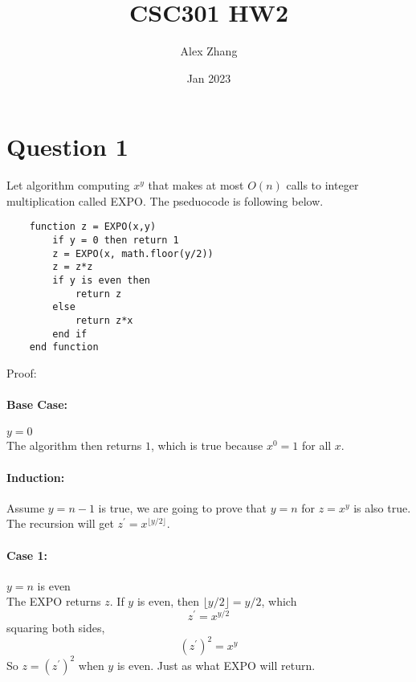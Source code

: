 \documentclass{article}
\title{CSC301 HW2}
\author{Alex Zhang}
\date{Jan 2023}
\begin{document}
\maketitle

\section*{Question 1} 
Let algorithm computing $x^y$ that makes at most $O(n)$ calls to integer multiplication called EXPO.
The pseduocode is following below.
\begin{verbatim}
    function z = EXPO(x,y)
        if y = 0 then return 1
        z = EXPO(x, math.floor(y/2))
        z = z*z
        if y is even then
            return z
        else
            return z*x
        end if
    end function
\end{verbatim}
Proof:
\paragraph{Base Case: } $y = 0$ \\
The algorithm then returns $1$, which is true because $x^0 = 1$ for all $x$.
\paragraph{Induction: } Assume $y = n-1$ is true, we are going to prove that $y = n$ for $z = x^y $ is also true.\\
The recursion will get $z^\prime = x^{\lfloor y/2 \rfloor}$.
\paragraph{Case 1: } $y = n$ is even\\
The EXPO returns $z$.
If $y$ is even, then $\lfloor y/2 \rfloor = y/2 $, which 
$$z^\prime = x^{y/2}$$
squaring both sides,
$$(z^\prime)^2 = x^y$$
So $z  = (z^\prime)^2$ when $y$ is even. Just as what EXPO will return.
\end{document}
